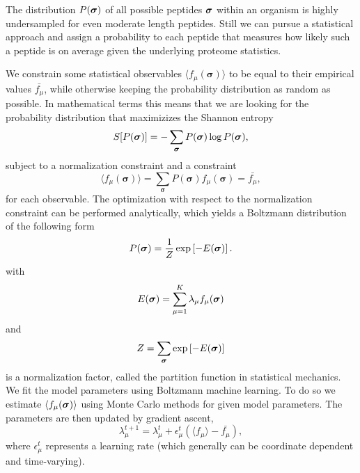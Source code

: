 The distribution $P(\boldsymbol \sigma)$ of all possible peptides $\boldsymbol \sigma$ within an organism is highly undersampled for even moderate length peptides. Still we can pursue a statistical approach and assign a probability to each peptide that measures how likely such a peptide is on average given the underlying proteome statistics.

We constrain some statistical observables $\langle f_\mu(\boldsymbol \sigma)\rangle$ to be equal to their empirical values $\bar{f_\mu}$, while otherwise keeping the probability distribution as random as possible. In mathematical terms this means that we are looking for the probability distribution that maximizizes the Shannon entropy
\begin{equation}
    S[P(\boldsymbol \sigma)] = - \sum_{\boldsymbol \sigma} P(\boldsymbol \sigma) \log P(\boldsymbol \sigma),
\end{equation}
subject to a normalization constraint and a constraint
\begin{equation}
    \langle f_\mu(\boldsymbol \sigma)\rangle = \sum_{\boldsymbol \sigma} P(\boldsymbol \sigma) f_\mu(\boldsymbol \sigma) = \bar{f_\mu},
\end{equation}
for each observable.
The optimization with respect to the normalization constraint can be performed analytically, which yields a Boltzmann distribution of the following form
\begin{equation}
    P(\boldsymbol \sigma) = \frac{1}{Z} \exp\left[ -E(\boldsymbol \sigma) \right].
\end{equation}
with 
\begin{equation}
 E(\boldsymbol \sigma) = \sum_{\mu=1}^K \lambda_\mu f_\mu(\boldsymbol \sigma)
\end{equation}
and 
\begin{equation}
    Z = \sum_{\boldsymbol \sigma} \exp \left[ - E(\boldsymbol \sigma) \right]
\end{equation}
    is a normalization factor, called the partition function in statistical mechanics.
We fit the model parameters using Boltzmann machine learning. To do so we estimate $\langle f_\mu(\boldsymbol \sigma)\rangle$ using Monte Carlo methods for given model parameters. The parameters are then updated by gradient ascent,
\begin{equation}
    \lambda_\mu^{t+1} = \lambda_\mu^t + \epsilon_\mu^t \left(\langle f_\mu \rangle  - \bar{f_\mu}\right),
\end{equation}
where $\epsilon_\mu^t$ represents a learning rate (which generally can be coordinate dependent and time-varying).


